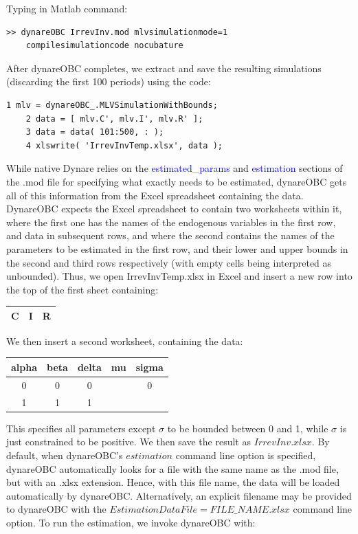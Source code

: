 \documentclass[cn,10pt,math=newtx,citestyle=gb7714-2015,bibstyle=gb7714-2015]{elegantbook}
\begin{document}
Typing in Matlab command:

\begin{lstlisting}[frame=shadowbox]
	>> dynareOBC IrrevInv.mod mlvsimulationmode=1
	compilesimulationcode nocubature
\end{lstlisting}

After dynareOBC completes, we extract and save the resulting simulations (discarding the first 100 periods) using the code:

\begin{lstlisting}[frame=shadowbox]
	1 mlv = dynareOBC_.MLVSimulationWithBounds;
	2 data = [ mlv.C', mlv.I', mlv.R' ];
	3 data = data( 101:500, : );
	4 xlswrite( 'IrrevInvTemp.xlsx', data );
\end{lstlisting}

While native Dynare relies on the \textcolor{blue}{estimated\_params} and \textcolor{blue}{estimation} sections of the .mod file for specifying what exactly needs to be estimated, dynareOBC gets all of this information from the Excel spreadsheet containing the data. DynareOBC expects the Excel spreadsheet to contain two worksheets within it, where the first one has the names of the endogenous variables in the first row, and data in subsequent rows, and where the second contains the names of the
parameters to be estimated in the first row, and their lower and upper bounds in the second and third rows respectively (with empty cells being interpreted as unbounded). Thus, we open IrrevInvTemp.xlsx in Excel and insert a new row into the top of the first sheet containing:

\begin{table}[htbp!]
	\centering
	\begin{tabular}{ccc}
		\hline
		C&I&R\\
		\hline
	\end{tabular}
\end{table}

We then insert a second worksheet, containing the data:
\begin{table}[htbp!]
	\centering
	\begin{tabular}{ccccc}
		\hline
		alpha &beta &delta &mu &sigma\\
		\hline
		0&0&0&&0\\
		1&1&1&&\\
		\hline
	\end{tabular}
\end{table}

This specifies all parameters except $\sigma$ to be bounded between 0 and 1, while $\sigma$ is just constrained to be positive. We then save the result as $IrrevInv.xlsx$. By default, when dynareOBC’s $estimation$ command line option is specified, dynareOBC automatically looks for a file with the same name as the .mod file, but with an .xlsx extension. Hence, with this file name, the data will be loaded automatically by dynareOBC. Alternatively, an explicit filename may be provided
to dynareOBC with the $EstimationDataFile=FILE\_NAME.xlsx$ command line option. To run the estimation, we invoke dynareOBC with:
\end{document}
